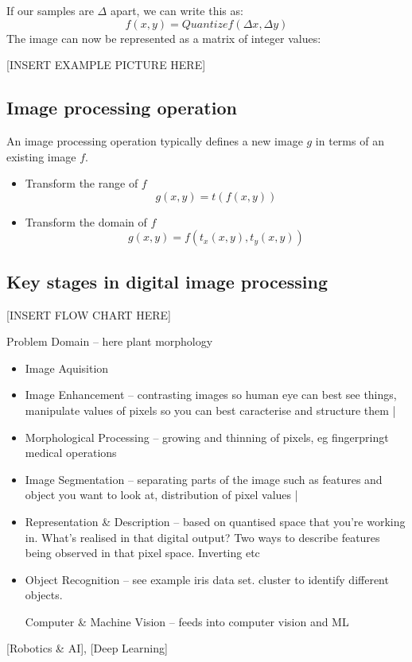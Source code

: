 If our samples are \( \Delta \) apart, we can write this as:
\[
f(x,y) = Quantize{f(\Delta x, \Delta y)}
\]
The image can now be represented as a matrix of integer values:

[INSERT EXAMPLE PICTURE HERE]


\subsection{Image processing operation}

An image processing operation typically defines a new image \( g \) in terms of an existing image \( f \).
\begin{itemize}
	\item Transform the range of \( f \)
	\[ 
	g(x, y) = t(f(x,y)) 
	\]
	\item Transform the domain of \( f \)
	\[
	g(x,y) = f(t_{x}(x,y), t_{y}(x,y))
	\]
\end{itemize}

\subsection{Key stages in digital image processing}

[INSERT FLOW CHART HERE]

	Problem Domain -- here plant morphology 
\begin{itemize}
	\item Image Aquisition
	\item Image Enhancement -- contrasting images so human eye can best see things, manipulate values of pixels so you can best caracterise and structure them |
	\item Morphological Processing -- growing and thinning of pixels, eg fingerpringt medical operations
	\item Image Segmentation -- separating parts of the image such as features and object you want to look at, distribution of pixel values |
	\item Representation \& Description -- based on quantised space that you're working in. What's realised in that digital output? Two ways to describe features being observed in that pixel space. Inverting etc
	\item Object Recognition -- see example iris data set. cluster to identify different objects.
	\item [Computer \& Machine Vision] -- feeds into computer vision and ML
\end{itemize}
	[Robotics \& AI], [Deep Learning]
	
